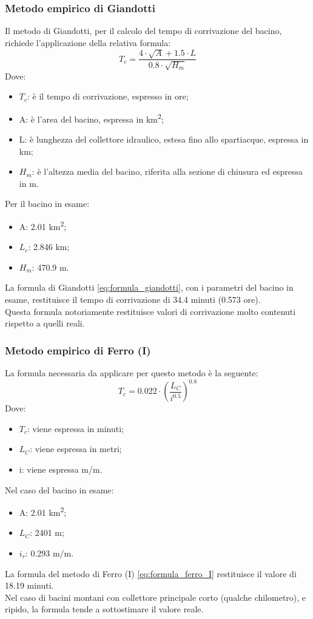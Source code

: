 \subsubsection{Metodo empirico di Giandotti}
Il metodo di Giandotti, per il calcolo del tempo di corrivazione del bacino, richiede l'applicazione della relativa formula:
\begin{equation}
    T_c = \frac{4 \cdot \sqrt{A}+ 1.5 \cdot L}{0.8 \cdot \sqrt{H_m}}
\label{eq:formula_giandotti}
\end{equation}
Dove: 
\begin{itemize}
    \item $T_c$: è il tempo di corrivazione, espresso in ore;
    \item A: è l'area del bacino, espressa in \unit{km^2};
    \item L: è lunghezza del collettore idraulico, estesa fino allo spartiacque, espressa in km;
    \item $H_m$: è l'altezza media del bacino, riferita alla sezione di chiusura ed espressa in m.
\end{itemize}
Per il bacino in esame:
\begin{itemize}
    \item A: 2.01 \unit{km^2};
    \item $L_c$: 2.846 \unit{km};
    \item $H_m$: 470.9 \unit{m}.
\end{itemize}
La formula di Giandotti \eqref{eq:formula_giandotti}, con i parametri del bacino in esame, restituisce il tempo di corrivazione di 34.4 minuti (0.573 ore).\\
Questa formula notoriamente restituisce valori di corrivazione molto contenuti rispetto a quelli reali.

\subsubsection{Metodo empirico di Ferro (I)}
La formula necessaria da applicare per questo metodo è la seguente:
\begin{equation}
    T_c = 0.022 \cdot \left(\frac{L_C}{i^{0.5}}\right)^{0.8}
    \label{eq:formula_ferro_I}
\end{equation}
Dove: 
\begin{itemize}
    \item $T_c$: viene espressa in minuti;
    \item $L_C$: viene espressa in metri;
    \item i: viene espressa \unit{m/m}.
\end{itemize}
Nel caso del bacino in esame:
\begin{itemize}
    \item A: 2.01 \unit{km^2};
    \item $L_C$: 2401 \unit{m};
    \item $i_r$: 0.293 \unit{m/m}.
\end{itemize}
La formula del metodo di Ferro (I) \eqref{eq:formula_ferro_I} restituisce il valore di 18.19 minuti.\\
Nel caso di bacini montani con collettore principale corto (qualche chilometro), e ripido, la formula tende a sottostimare il valore reale.

